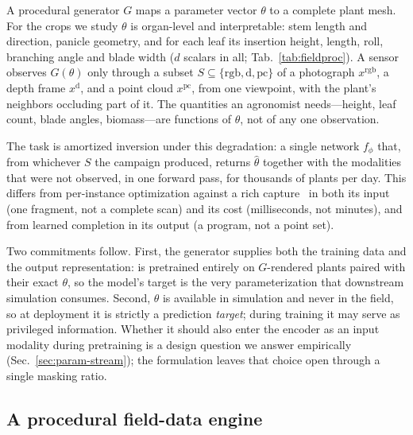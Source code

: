 A procedural generator $G$ maps a parameter vector $\theta$ to a complete plant
mesh. For the crops we study $\theta$ is organ-level and interpretable: stem
length and direction, panicle geometry, and for each leaf its insertion height,
length, roll, branching angle and blade width ($d$ scalars in all;
Tab.~\ref{tab:fieldproc}). A sensor observes $G(\theta)$ only through a subset
$S\subseteq\{\mathrm{rgb},\mathrm{d},\mathrm{pc}\}$ of a photograph
$x^{\mathrm{rgb}}$, a depth frame $x^{\mathrm{d}}$, and a point cloud
$x^{\mathrm{pc}}$, from one viewpoint, with the plant's neighbors occluding part
of it. The quantities an agronomist needs---height, leaf count, blade angles,
biomass---are functions of $\theta$, not of any one observation.

The task is amortized inversion under this degradation: a single network
$f_\phi$ that, from whichever $S$ the campaign produced, returns $\hat\theta$
together with the modalities that were not observed, in one forward pass, for
thousands of plants per day. This differs from per-instance optimization
against a rich capture~\cite{hadadi2025vlm} in both its input (one fragment,
not a complete scan) and its cost (milliseconds, not minutes), and from
learned completion in its output (a program, not a point set).

Two commitments follow. First, the generator supplies both the training data
and the output representation: \CropCode{} is pretrained entirely on
$G$-rendered plants paired with their exact $\theta$, so the model's target is
the very parameterization that downstream simulation consumes. Second,
$\theta$ is available in simulation and never in the field, so at deployment
it is strictly a prediction \emph{target}; during training it may serve as
privileged information. Whether it should also enter the encoder as an input
modality during pretraining is a design question we answer empirically
(Sec.~\ref{sec:param-stream}); the formulation leaves that choice open through
a single masking ratio.

\subsection{A procedural field-data engine}
\label{sec:data}

